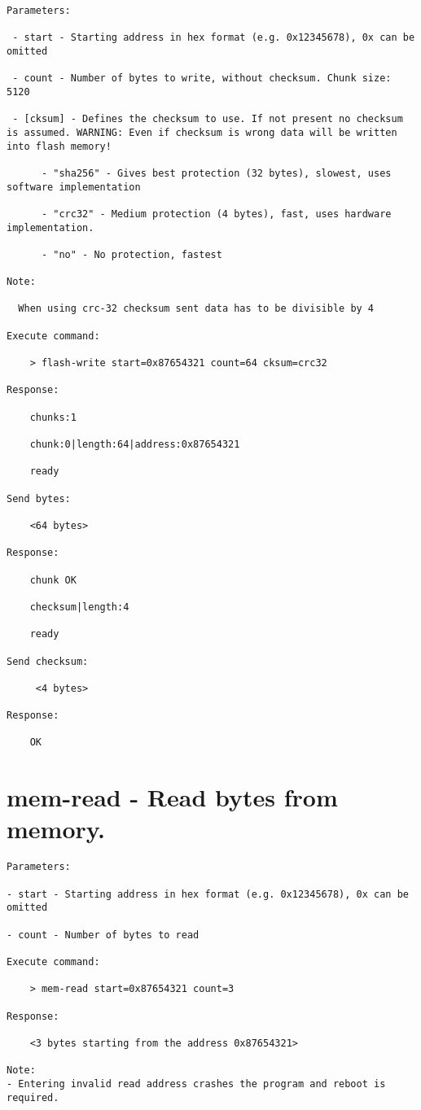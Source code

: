 \begin{lstlisting}
Parameters:

 - start - Starting address in hex format (e.g. 0x12345678), 0x can be omitted
     
 - count - Number of bytes to write, without checksum. Chunk size: 5120
 
 - [cksum] - Defines the checksum to use. If not present no checksum is assumed. WARNING: Even if checksum is wrong data will be written into flash memory!
 
      - "sha256" - Gives best protection (32 bytes), slowest, uses software implementation
           
      - "crc32" - Medium protection (4 bytes), fast, uses hardware implementation.

      - "no" - No protection, fastest

Note:

  When using crc-32 checksum sent data has to be divisible by 4

Execute command: 

    > flash-write start=0x87654321 count=64 cksum=crc32  
    
Response: 

    chunks:1

    chunk:0|length:64|address:0x87654321

    ready
    
Send bytes:

    <64 bytes>
    
Response:

    chunk OK

    checksum|length:4

    ready
 
Send checksum:
     
     <4 bytes>
     
Response:
 
    OK
\end{lstlisting}

\section{mem-read - Read bytes from memory.}
\label{bl_cmd:mem-read}

\begin{lstlisting}
Parameters:

- start - Starting address in hex format (e.g. 0x12345678), 0x can be omitted
     
- count - Number of bytes to read

Execute command: 

    > mem-read start=0x87654321 count=3  
    
Response: 

    <3 bytes starting from the address 0x87654321>
    
Note:
- Entering invalid read address crashes the program and reboot is required. 
\end{lstlisting}

